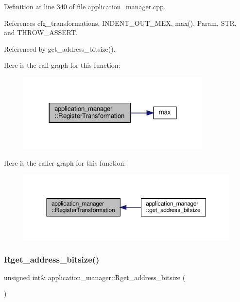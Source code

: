Definition at line 340 of file application\+\_\+manager.\+cpp.



References cfg\+\_\+transformations, I\+N\+D\+E\+N\+T\+\_\+\+O\+U\+T\+\_\+\+M\+EX, max(), Param, S\+TR, and T\+H\+R\+O\+W\+\_\+\+A\+S\+S\+E\+RT.



Referenced by get\+\_\+address\+\_\+bitsize().

Here is the call graph for this function\+:
\nopagebreak
\begin{figure}[H]
\begin{center}
\leavevmode
\includegraphics[width=276pt]{dc/db5/classapplication__manager_afd61443628a45c82ceb70e96f5b8f51c_cgraph}
\end{center}
\end{figure}
Here is the caller graph for this function\+:
\nopagebreak
\begin{figure}[H]
\begin{center}
\leavevmode
\includegraphics[width=350pt]{dc/db5/classapplication__manager_afd61443628a45c82ceb70e96f5b8f51c_icgraph}
\end{center}
\end{figure}
\mbox{\label{classapplication__manager_a1a6316f5547af7a16324968df759997c}} 
\subsubsection{\texorpdfstring{Rget\+\_\+address\+\_\+bitsize()}{Rget\_address\_bitsize()}}
{\footnotesize\ttfamily unsigned int\& application\+\_\+manager\+::\+Rget\+\_\+address\+\_\+bitsize (\begin{DoxyParamCaption}{ }\end{DoxyParamCaption})\hspace{0.3cm}{\ttfamily [inline]}}



